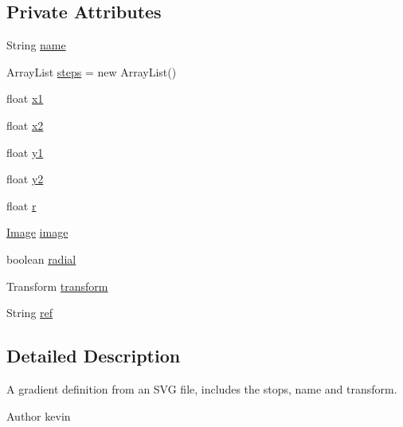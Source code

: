 \subsection*{Private Attributes}
\begin{DoxyCompactItemize}
\item 
String \mbox{\hyperlink{classorg_1_1newdawn_1_1slick_1_1svg_1_1_gradient_a170cbb8709185dc426c216ba621f579f}{name}}
\item 
Array\+List \mbox{\hyperlink{classorg_1_1newdawn_1_1slick_1_1svg_1_1_gradient_a68867778840106c7c126e26065b86bb0}{steps}} = new Array\+List()
\item 
float \mbox{\hyperlink{classorg_1_1newdawn_1_1slick_1_1svg_1_1_gradient_a3cd592974e65659efb2ae92a73420938}{x1}}
\item 
float \mbox{\hyperlink{classorg_1_1newdawn_1_1slick_1_1svg_1_1_gradient_ab71f7951495ddd6c4394e05f038d7487}{x2}}
\item 
float \mbox{\hyperlink{classorg_1_1newdawn_1_1slick_1_1svg_1_1_gradient_a6dd1b7c9e7ab1e8e2ba41232cd933046}{y1}}
\item 
float \mbox{\hyperlink{classorg_1_1newdawn_1_1slick_1_1svg_1_1_gradient_a75141315026ebdfdbb8d222a8c7358c6}{y2}}
\item 
float \mbox{\hyperlink{classorg_1_1newdawn_1_1slick_1_1svg_1_1_gradient_a9eb9e743742ccbcdbcd4118d9457de24}{r}}
\item 
\mbox{\hyperlink{classorg_1_1newdawn_1_1slick_1_1_image}{Image}} \mbox{\hyperlink{classorg_1_1newdawn_1_1slick_1_1svg_1_1_gradient_ac3ba3aa0d42efe130b9b1e6a0da020cb}{image}}
\item 
boolean \mbox{\hyperlink{classorg_1_1newdawn_1_1slick_1_1svg_1_1_gradient_a61d950bb9ea6a93f13772e9c536241a3}{radial}}
\item 
Transform \mbox{\hyperlink{classorg_1_1newdawn_1_1slick_1_1svg_1_1_gradient_a2ea5e518ebb63dd89e1613c7dcd40076}{transform}}
\item 
String \mbox{\hyperlink{classorg_1_1newdawn_1_1slick_1_1svg_1_1_gradient_af0df4455cb66dc48f4bcef9c24b3f886}{ref}}
\end{DoxyCompactItemize}


\subsection{Detailed Description}
A gradient definition from an S\+VG file, includes the stops, name and transform.

\begin{DoxyAuthor}{Author}
kevin 
\end{DoxyAuthor}


